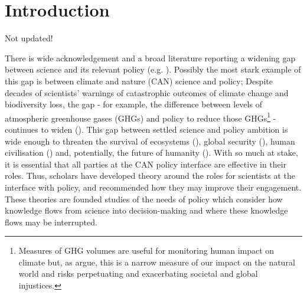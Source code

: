 \chapter{Introduction}\label{ch:intro}



Not updated!

There is wide acknowledgement and a broad literature reporting a widening gap between science and its relevant policy (e.g. \cite{Nau2009,EdlerKB2022}). Possibly the most stark example of this gap is between climate and nature (CAN) science and policy; Despite decades of scientists' warnings of catastrophic outcomes of climate change and biodiversity loss, the gap - for example, the difference between levels of atmospheric greenhouse gases (GHGs) and policy to reduce those GHGs\footnote{Measures of GHG volumes are useful for monitoring human impact on climate but, as \textcite{MorenoSF2016} argue, this is a narrow measure of our impact on the natural world and risks perpetuating and exacerbating societal and global injustices.} - continues to widen (\cite{StoddardEtAl2021,IPBES2022,IPCC2023}). This gap between settled science and policy ambition is wide enough to threaten the survival of ecosystems (\cite{DiazEtAl2019,IPBES2022}), global security (\cite{WEF2024}), human civilisation (\cite{TschakertEAKO2019}) and, potentially, the future of humanity (\cite{McKayEtAl2022}). With so much at stake, it is essential that all parties at the CAN policy interface are effective in their roles. Thus, scholars have developed theory around the roles for scientists at the interface with policy, and recommended how they may improve their engagement. These theories are founded studies of the needs of policy which consider how knowledge flows from science into decision-making and where these knowledge flows may be interrupted. 

